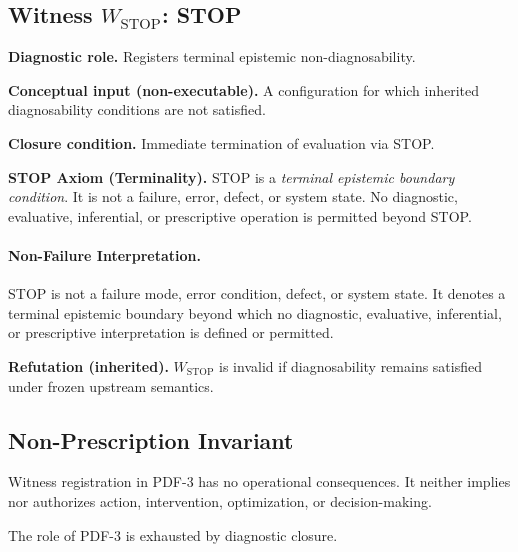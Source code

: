 \subsection{\texorpdfstring{Witness $W_{\mathrm{STOP}}$: STOP}{Witness WSTOP: STOP}}

\textbf{Diagnostic role.}
Registers terminal epistemic non-diagnosability.

\textbf{Conceptual input (non-executable).}
A configuration for which inherited diagnosability conditions
are not satisfied.

\textbf{Closure condition.}
Immediate termination of evaluation via STOP.

\textbf{STOP Axiom (Terminality).}
STOP is a \emph{terminal epistemic boundary condition}.
It is not a failure, error, defect, or system state.
No diagnostic, evaluative, inferential, or prescriptive
operation is permitted beyond STOP.

\paragraph{Non-Failure Interpretation.}
STOP is not a failure mode, error condition, defect, or system state.
It denotes a terminal epistemic boundary beyond which no diagnostic,
evaluative, inferential, or prescriptive interpretation is defined
or permitted.

\textbf{Refutation (inherited).}
$W_{\mathrm{STOP}}$ is invalid if diagnosability remains satisfied
under frozen upstream semantics.

\subsection{Non-Prescription Invariant}

Witness registration in PDF-3 has no operational consequences.
It neither implies nor authorizes action, intervention,
optimization, or decision-making.

The role of PDF-3 is exhausted by diagnostic closure.
